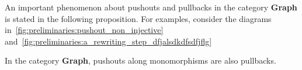 An important phenomenon about pushouts and pullbacks in the category \textbf{Graph} is stated in the following proposition. For examples, consider the diagrams in~\autoref{fig:preliminaries:pushout_non_injective} and~\autoref{fig:preliminaries:a_rewriting_step_dfjalsdkdfsdfjflg}
\begin{proposition}
    \label{prop:pb_eq_po}
    In the category \textbf{Graph}, pushouts along monomorphisms are also pullbacks. 
\end{proposition}
